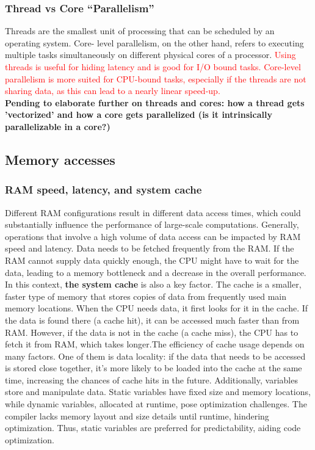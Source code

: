 \documentclass{article}
\begin{document}
        \subsubsection{Thread vs Core ``Parallelism''}
        Threads are the smallest unit of processing that can be scheduled by an operating system. Core- level parallelism, on the other hand, refers to executing multiple tasks simultaneously on different physical cores of a processor.\textcolor{red}{  Using threads is useful for hiding latency and is good for I/O bound tasks. Core-level parallelism is more suited for CPU-bound tasks, especially if the threads are not sharing data, as this can lead to a nearly linear speed-up.}
        \\
        \textbf{Pending to elaborate further on threads and cores: how a thread gets 'vectorized' and how a core gets parallelized (is it intrinsically parallelizable in a core?)}
        
        

    
    \subsection{Memory accesses}

        \subsubsection{RAM speed, latency, and system cache} 
        Different RAM configurations result in different data access times, which could substantially influence the performance of large-scale computations. Generally, operations that involve a high volume of data access can be impacted by RAM speed and latency. %
        Data needs to be fetched frequently from the RAM. If the RAM cannot supply data quickly enough, the CPU might have to wait for the data, leading to a memory bottleneck and a decrease in the overall performance.
        In this context, \textbf{the system cache} is also a key factor. The cache is a smaller, faster type of memory that stores copies of data from frequently used main memory locations. When the CPU needs data, it first looks for it in the cache. If the data is found there (a cache hit), it can be accessed much faster than from RAM. However, if the data is not in the cache (a cache miss), the CPU has to fetch it from RAM, which takes longer.The efficiency of cache usage depends on many factors. One of them is data locality: if the data that needs to be accessed is stored close together, it’s more likely to be loaded into the cache at the same time, increasing the chances of cache hits in the future. Additionally, variables store and manipulate data. Static variables have fixed size and memory locations, while dynamic variables, allocated at runtime, pose optimization challenges. The compiler lacks memory layout and size details until runtime, hindering optimization. Thus, static variables are preferred for predictability, aiding code optimization.
\end{document}
